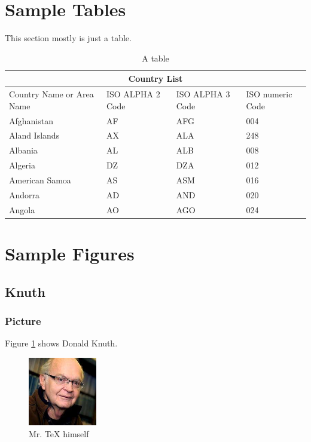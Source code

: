 \documentclass[ece]{uw-wkrpt}
\begin{document}
\section{Sample Tables}
This section mostly is just a table.
    \begin{table}[h]
        \centering
        \caption{A table}
        \label{tab:test}
        \begin{tabular}{ |p{3cm}||p{3cm}|p{3cm}|p{3cm}|  }
         \hline
         \multicolumn{4}{|c|}{Country List} \\
         \hline
         Country Name     or Area Name& ISO ALPHA 2 Code &ISO ALPHA 3 Code&ISO numeric Code\\
         \hline
         Afghanistan   & AF    &AFG&   004\\
         Aland Islands&   AX  & ALA   &248\\
         Albania &AL & ALB&  008\\
         Algeria    &DZ & DZA&  012\\
         American Samoa&   AS  & ASM&016\\
         Andorra& AD  & AND   &020\\
         Angola& AO  & AGO&024\\
         \hline
        \end{tabular}
    \end{table}

\section{Sample Figures}
    \subsection{Knuth}
        \subsubsection{Picture}
            Figure \ref{fig:knuth} shows Donald Knuth. \cite{ref:donpicture}
            \begin{figure}
                \centering
                \includegraphics[height=3cm]{test.jpg}
                \caption{Mr. \TeX{} himself }
                \label{fig:knuth}
            \end{figure}
\end{document}
